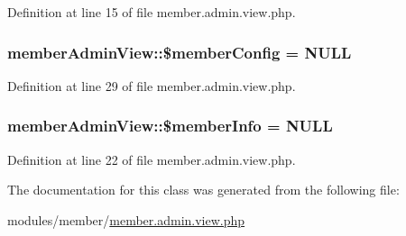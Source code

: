 Definition at line 15 of file member.\+admin.\+view.\+php.

\subsubsection[{\texorpdfstring{\$member\+Config}{$memberConfig}}]{\setlength{\rightskip}{0pt plus 5cm}member\+Admin\+View\+::\$member\+Config = N\+U\+LL}\hypertarget{classmemberAdminView_acd19132e0c8fd313edebad04734206f9}{}\label{classmemberAdminView_acd19132e0c8fd313edebad04734206f9}


Definition at line 29 of file member.\+admin.\+view.\+php.

\subsubsection[{\texorpdfstring{\$member\+Info}{$memberInfo}}]{\setlength{\rightskip}{0pt plus 5cm}member\+Admin\+View\+::\$member\+Info = N\+U\+LL}\hypertarget{classmemberAdminView_a4955a7b9bc128c344a2987dd1cb8e043}{}\label{classmemberAdminView_a4955a7b9bc128c344a2987dd1cb8e043}


Definition at line 22 of file member.\+admin.\+view.\+php.



The documentation for this class was generated from the following file\+:\begin{DoxyCompactItemize}
\item 
modules/member/\hyperlink{member_8admin_8view_8php}{member.\+admin.\+view.\+php}\end{DoxyCompactItemize}
